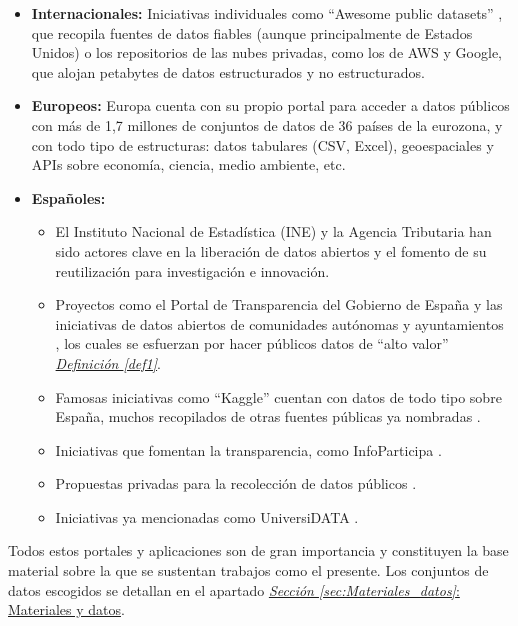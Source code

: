 \begin{itemize}
	\item \textbf{Internacionales:}  
	Iniciativas individuales como ``Awesome public datasets'' \citep{awesomePublicDatasets}, que recopila fuentes de datos fiables (aunque principalmente de Estados Unidos) o los repositorios de las nubes privadas, como los de AWS y Google, que alojan petabytes de datos estructurados y no estructurados.
	
	\item \textbf{Europeos:}  
	Europa cuenta con su propio portal para acceder a datos públicos \citep{PortalDatosEuropa} con más de 1,7 millones de conjuntos de datos de 36 países de la eurozona, y con todo tipo de estructuras: datos tabulares (CSV, Excel), geoespaciales y APIs sobre economía, ciencia, medio ambiente, etc.
	
	\item \textbf{Españoles:}
	\begin{itemize}
		\item El Instituto Nacional de Estadística (INE) y la Agencia Tributaria han sido actores clave en la liberación de datos abiertos y el fomento de su reutilización para investigación e innovación.  
		\item Proyectos como el Portal de Transparencia del Gobierno de España y las iniciativas de datos abiertos de comunidades autónomas y ayuntamientos \citep{PortalDatosGob, PortalDatosMadrid, PortalRegistradores}, los cuales se esfuerzan por hacer públicos datos de ``alto valor'' \hyperref[def1]{\textit{Definición \ref*{def1}}}.  
		\item Famosas iniciativas como ``Kaggle'' cuentan con datos de todo tipo sobre España, muchos recopilados de otras fuentes públicas ya nombradas \citep{KaggleDatasetsSpain}.
		\item Iniciativas que fomentan la transparencia, como InfoParticipa \citep{PortalInfoparticipa}.  
		\item Propuestas privadas para la recolección de datos públicos \citep{PortalEsriEspanna}.  
		\item Iniciativas ya mencionadas como UniversiDATA \citep{UniversiDATA}.  
	\end{itemize}
\end{itemize}

Todos estos portales y aplicaciones son de gran importancia y constituyen la base material sobre la que se sustentan trabajos como el presente. Los conjuntos de datos escogidos se detallan en el apartado \hyperref[sec:Materiales_datos]{\textit{Sección \ref*{sec:Materiales_datos}}: Materiales y datos}. 

